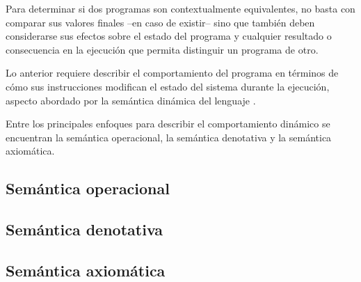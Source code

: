 Para determinar si dos programas son contextualmente equivalentes, no basta con comparar sus valores finales --en caso de existir-- sino que también deben considerarse sus efectos sobre el estado del programa y cualquier resultado o consecuencia en la ejecución que permita distinguir un programa de otro.

Lo anterior requiere describir el comportamiento del programa en términos de cómo sus instrucciones modifican el estado del sistema durante la ejecución, aspecto abordado por la semántica dinámica del lenguaje \cite{ldp_n06}.

Entre los principales enfoques para describir el comportamiento dinámico  se encuentran la semántica operacional, la semántica denotativa y la semántica axiomática.

\subsection{Semántica operacional}


\subsection{Semántica denotativa}


\subsection{Semántica axiomática}
